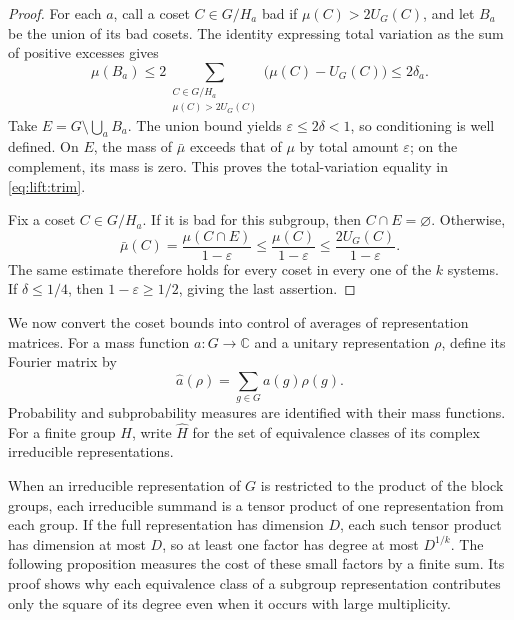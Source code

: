 \begin{proof}
For each \(a\), call a coset \(C\in G/H_a\) bad if
\(\mu(C)>2U_G(C)\), and let \(B_a\) be the union of its bad cosets.
The identity expressing total variation as the sum of positive excesses
gives
\[
  \mu(B_a)
  \le 2\sum_{\substack{C\in G/H_a\\ \mu(C)>2U_G(C)}}
                 \bigl(\mu(C)-U_G(C)\bigr)
  \le 2\delta_a.
\]
Take \(E=G\setminus\bigcup_a B_a\). The union bound yields
\(\varepsilon\le 2\delta<1\), so conditioning is well defined. On \(E\),
the mass of \(\bar\mu\) exceeds that of \(\mu\) by total amount
\(\varepsilon\); on the complement, its mass is zero. This proves the
total-variation equality in \eqref{eq:lift:trim}.

Fix a coset \(C\in G/H_a\). If it is bad for this subgroup, then
\(C\cap E=\varnothing\). Otherwise,
\[
  \bar\mu(C)
  =\frac{\mu(C\cap E)}{1-\varepsilon}
  \le \frac{\mu(C)}{1-\varepsilon}
  \le \frac{2U_G(C)}{1-\varepsilon}.
\]
The same estimate therefore holds for every coset in every one of the
\(k\) systems. If \(\delta\le 1/4\), then
\(1-\varepsilon\ge 1/2\), giving the last assertion.
\end{proof}

We now convert the coset bounds into control of averages of representation
matrices. For a mass function \(a:G\to\mathbb C\) and a unitary
representation \(\rho\), define its Fourier matrix by
\[
  \widehat a(\rho)=\sum_{g\in G}a(g)\rho(g).
\]
Probability and subprobability measures are identified with their mass
functions. For a finite group \(H\), write \(\widehat H\) for the set of
equivalence classes of its complex irreducible representations.

When an irreducible representation of \(G\) is restricted to the product
of the block groups, each irreducible summand is a tensor product of one
representation from each group. If the full representation has dimension
\(D\), each such tensor product has dimension at most \(D\), so at least
one factor has degree at most \(D^{1/k}\). The following proposition
measures the cost of these small factors by a finite sum. Its proof shows
why each equivalence class of a subgroup representation contributes only
the square of its degree even when it occurs with large multiplicity.

